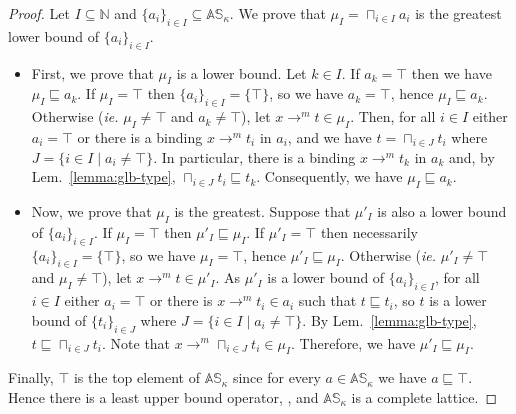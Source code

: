 \begin{proof}
  Let $I\subseteq\mathbb{N}$ and $\{a_i\}_{i\in I}\subseteq\mathbb{AS}_\kappa$.
  We prove that $\mu_I=\sqcap_{i\in I}a_i$ is the greatest lower bound of
  $\{a_i\}_{i\in I}$.
  \begin{itemize}
    \item First, we prove that $\mu_I$ is a lower bound.
      Let $k\in I$. If
      $a_k=\top$ then we have
    $\mu_I \sqsubseteq a_k$. If $\mu_I = \top$ then $\{a_i\}_{i\in I}=\{\top\}$,
    so we have $a_k=\top$, hence $\mu_I \sqsubseteq a_k$.
    Otherwise (\textit{ie.}  $\mu_I\neq\top$ and
    $a_k\neq\top$), let $x\to^m t\in \mu_I$. Then, for all $i\in I$ either
    $a_i=\top$ or there is a binding $x\to^m t_i$ in $a_i$, and we have
    $t = \sqcap_{i\in J}t_i$ where $J=\{i\in I\mid a_i\neq\top\}$. In particular,
    there is a binding $x\to^m t_k$ in $a_k$ and, by Lem.~\ref{lemma:glb-type},
    $\sqcap_{i\in J}t_i \sqsubseteq t_k$. Consequently, we have
    $\mu_I \sqsubseteq a_k$.
    \item Now, we prove that $\mu_I$ is the greatest.
    Suppose that $\mu'_I$ is also a lower bound of $\{a_i\}_{i\in I}$.
    If  $\mu_I=\top$ then $\mu'_I \sqsubseteq \mu_I$.
    If $\mu'_I=\top$ then necessarily $\{a_i\}_{i\in I}=\{\top\}$, so
    we have $\mu_I=\top$, hence $\mu'_I \sqsubseteq \mu_I$.
    Otherwise (\textit{ie.}  $\mu'_I\neq\top$
    and $\mu_I\neq\top$),
    let $x\to^m t\in \mu'_I$. As $\mu'_I$ is a lower bound of $\{a_i\}_{i\in I}$,
    for all $i\in I$ either $a_i=\top$ or there is $x\to^m t_i\in a_i$ such
    that $t\sqsubseteq t_i$, so $t$ is a lower bound of $\{t_i\}_{i\in J}$
    where $J=\{i\in I\mid a_i\neq\top\}$. By Lem.~\ref{lemma:glb-type},
    $t\sqsubseteq \sqcap_{i\in J}t_i$. Note that
    $x\to^m \sqcap_{i\in J}t_i\in \mu_I$. Therefore, we have
    $\mu'_I \sqsubseteq \mu_I$.
  \end{itemize}

  Finally, $\top$ is the top element of $\mathbb{AS}_\kappa$
  since for every $a\in\mathbb{AS}_\kappa$ we have $a\sqsubseteq\top$.
  Hence there is a least upper bound operator, ,
  and $\mathbb{AS}_\kappa$ is a complete lattice.
\end{proof}

